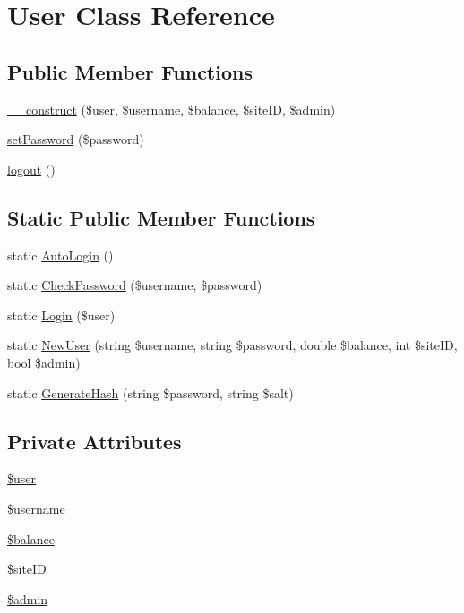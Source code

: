 \hypertarget{classmnorman_leads_1_1_user}{\section{User Class Reference}
\label{classmnorman_leads_1_1_user}
}
\subsection*{Public Member Functions}
\begin{DoxyCompactItemize}
\item 
\hyperlink{classmnorman_leads_1_1_user_a6795462ff53bc37a7c99481c4cb4b5f6}{\-\_\-\-\_\-construct} (\$user, \$username, \$balance, \$site\-I\-D, \$admin)
\item 
\hyperlink{classmnorman_leads_1_1_user_a3e35c8d3dbb2c513c618a664389e0926}{set\-Password} (\$password)
\item 
\hyperlink{classmnorman_leads_1_1_user_a082405d89acd6835c3a7c7a08a7adbab}{logout} ()
\end{DoxyCompactItemize}
\subsection*{Static Public Member Functions}
\begin{DoxyCompactItemize}
\item 
static \hyperlink{classmnorman_leads_1_1_user_a9c058a346a08a797dd8df3ecdafa4d64}{Auto\-Login} ()
\item 
static \hyperlink{classmnorman_leads_1_1_user_a3a60c336c7bd080d1945d5f4bc204ec2}{Check\-Password} (\$username, \$password)
\item 
static \hyperlink{classmnorman_leads_1_1_user_a3f3ecd6f91f8c9481453a1d88413f6d0}{Login} (\$user)
\item 
static \hyperlink{classmnorman_leads_1_1_user_a2062a54ca3ea171026902b1a0c3d14a5}{New\-User} (string \$username, string \$password, double \$balance, int \$site\-I\-D, bool \$admin)
\item 
static \hyperlink{classmnorman_leads_1_1_user_a958b012718fc4f8bd24be6d82286a71b}{Generate\-Hash} (string \$password, string \$salt)
\end{DoxyCompactItemize}
\subsection*{Private Attributes}
\begin{DoxyCompactItemize}
\item 
\hyperlink{classmnorman_leads_1_1_user_a598ca4e71b15a1313ec95f0df1027ca5}{\$user}
\item 
\hyperlink{classmnorman_leads_1_1_user_a0eb82aa5f81cf845de4b36cd653c42cf}{\$username}
\item 
\hyperlink{classmnorman_leads_1_1_user_ac600cdfc056c66926d1b3f5aff7088a9}{\$balance}
\item 
\hyperlink{classmnorman_leads_1_1_user_a70db0a8c5bfb8523860867c5670cd399}{\$site\-I\-D}
\item 
\hyperlink{classmnorman_leads_1_1_user_ad3b3c64b25fbbb6aec24407e4333aa71}{\$admin}
\end{DoxyCompactItemize}



